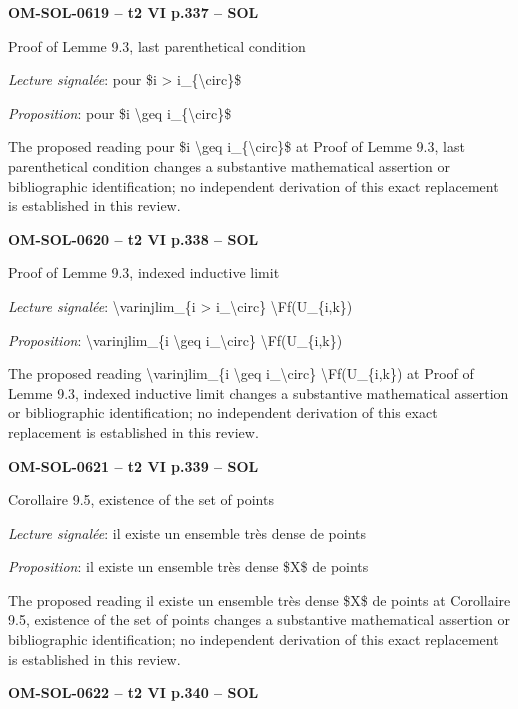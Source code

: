 \par\noindent\textbf{OM-SOL-0619 -- t2 VI p.337 -- SOL}\par
Proof of Lemme 9.3, last parenthetical condition\par
\emph{Lecture signalée}: pour \$i > i\_\{\textbackslash{}circ\}\$\par
\emph{Proposition}: pour \$i \textbackslash{}geq i\_\{\textbackslash{}circ\}\$\par
The proposed reading pour \$i \textbackslash{}geq i\_\{\textbackslash{}circ\}\$ at Proof of Lemme 9.3, last parenthetical condition changes a substantive mathematical assertion or bibliographic identification; no independent derivation of this exact replacement is established in this review.\par
\par\noindent\textbf{OM-SOL-0620 -- t2 VI p.338 -- SOL}\par
Proof of Lemme 9.3, indexed inductive limit\par
\emph{Lecture signalée}: \textbackslash{}varinjlim\_\{i > i\_\textbackslash{}circ\} \textbackslash{}Ff(U\_\{i,k\})\par
\emph{Proposition}: \textbackslash{}varinjlim\_\{i \textbackslash{}geq i\_\textbackslash{}circ\} \textbackslash{}Ff(U\_\{i,k\})\par
The proposed reading \textbackslash{}varinjlim\_\{i \textbackslash{}geq i\_\textbackslash{}circ\} \textbackslash{}Ff(U\_\{i,k\}) at Proof of Lemme 9.3, indexed inductive limit changes a substantive mathematical assertion or bibliographic identification; no independent derivation of this exact replacement is established in this review.\par
\par\noindent\textbf{OM-SOL-0621 -- t2 VI p.339 -- SOL}\par
Corollaire 9.5, existence of the set of points\par
\emph{Lecture signalée}: il existe un ensemble très dense de points\par
\emph{Proposition}: il existe un ensemble très dense \$X\$ de points\par
The proposed reading il existe un ensemble très dense \$X\$ de points at Corollaire 9.5, existence of the set of points changes a substantive mathematical assertion or bibliographic identification; no independent derivation of this exact replacement is established in this review.\par
\par\noindent\textbf{OM-SOL-0622 -- t2 VI p.340 -- SOL}\par
